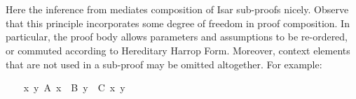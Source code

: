 \begin{isabellebody}
\begin{minipage}[t]{0.35\textwidth}
 \\
\end{minipage}\begin{minipage}[t]{0.4\textwidth}
 \\
 \\
\\
\\
 \\
 \\
\end{minipage}
%
\endisatagproof
{\isafoldproof}%
%
\isadelimproof
%
\endisadelimproof
%
\endgroup
%
\begin{isamarkuptext}%
\noindent Here the \hyperlink{inference.refinement}{\mbox{}} inference from
   mediates composition of Isar
  sub-proofs nicely.  Observe that this principle incorporates some
  degree of freedom in proof composition.  In particular, the proof
  body allows parameters and assumptions to be re-ordered, or commuted
  according to Hereditary Harrop Form.  Moreover, context elements
  that are not used in a sub-proof may be omitted altogether.  For
  example:%
\end{isamarkuptext}%
\isamarkuptrue%
%
\begin{minipage}{0.5\textwidth}
%
\isadelimproof
\ \ %
\endisadelimproof
%
\isatagproof
{}\isamarkupfalse%
\ {}{}x\ y{}\ A\ x\ {}\ B\ y\ {}\ C\ x\ y{}\isanewline

\end{minipage}
\end{isabellebody}
